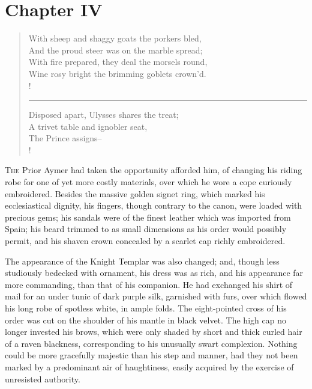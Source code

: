 \chapter{Chapter IV}

\begin{verse}
With sheep and shaggy goats the porkers bled,\\
And the proud steer was on the marble spread;\\
With fire prepared, they deal the morsels round,\\
Wine rosy bright the brimming goblets crown'd.\\!
\rule{.7\textwidth}{.2pt}

Disposed apart, Ulysses shares the treat;\\
A trivet table and ignobler seat,\\
The Prince assigns--\\!
\end{verse}

\lettrine{T}{he} Prior Aymer had taken the opportunity afforded him,
of changing his
riding robe for one of yet more costly materials, over which he wore a
cope curiously embroidered. Besides the massive golden signet ring,
which marked his ecclesiastical dignity, his fingers, though contrary to
the canon, were loaded with precious gems; his sandals were of the
finest leather which was imported from Spain; his beard trimmed to as
small dimensions as his order would possibly permit, and his shaven
crown concealed by a scarlet cap richly embroidered.

The appearance of the Knight Templar was also changed; and, though less
studiously bedecked with ornament, his dress was as rich, and his
appearance far more commanding, than that of his companion. He had
exchanged his shirt of mail for an under tunic of dark purple silk,
garnished with furs, over which flowed his long robe of spotless white,
in ample folds. The eight-pointed cross of his order was cut on the
shoulder of his mantle in black velvet. The high cap no longer invested
his brows, which were only shaded by short and thick curled hair of a
raven blackness, corresponding to his unusually swart complexion.
Nothing could be more gracefully majestic than his step and manner, had
they not been marked by a predominant air of haughtiness, easily
acquired by the exercise of unresisted authority.

